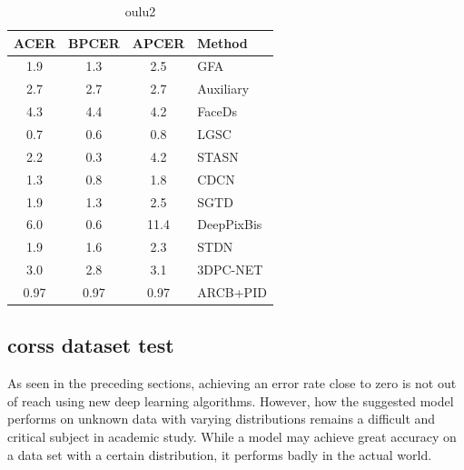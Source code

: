 \documentclass[journal]{IEEEtran}
\begin{document}
\begin{table}[ht]
	\caption{oulu2}
	\label{tab:oulu2}
	\centering
	\begin{tabular}{|c|c|c|l|}
		\hline             
		ACER &      BPCER          &      APCER &      Method                  \\
		\hline          1.9        &      1.3        &      2.5        & \cite{tu2020learning}     GFA  \\
		\hline          2.7        &      2.7        &      2.7        & \cite{liu2018learning}      Auxiliary  \\
		\hline         4.3        &      4.4        &      4.2        & \cite{jourabloo2018face}      FaceDs    \\
		\hline        0.7        &      0.6        &      0.8        & \cite{feng2020learning}      LGSC       \\
		\hline          2.2        &      0.3        &      4.2        & \cite{yang2019face}      STASN       \\
		\hline         1.3        &      0.8        &      1.8        & \cite{yu2020searching}      CDCN       \\
		\hline       1.9        &      1.3        &      2.5        & \cite{wang2020deep}      SGTD       \\
		\hline      6.0        &      0.6        &      11.4        & \cite{george2019deep}      DeepPixBis\\
		\hline      1.9        &      1.6        &      2.3        & \cite{liu2020disentangling}     STDN     \\
		\hline       3.0        &      2.8        &      3.1        & \cite{li20203dpc}        3DPC-NET        \\
		\hline       0.97 &      0.97           &      0.97        &      ARCB+PID \\              
		\hline         
	\end{tabular}
\end{table}





\subsection{corss dataset test}
As seen in the preceding sections, achieving an error rate close to zero is not out of reach using new deep learning algorithms. However, how the suggested model performs on unknown data with varying distributions remains a difficult and critical subject in academic study. While a model may achieve great accuracy on a data set with a certain distribution, it performs badly in the actual world.
\end{document}
